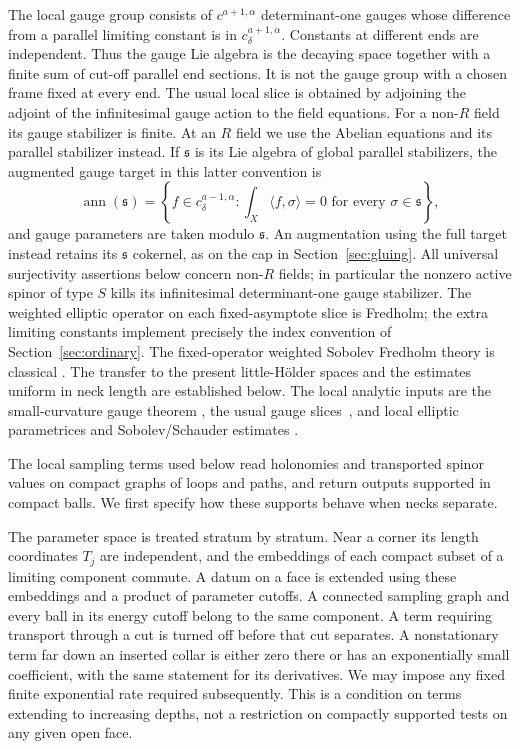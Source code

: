 The local gauge group consists of $c^{a+1,\alpha}$ determinant-one gauges
whose difference from a parallel limiting constant is in
$c^{a+1,\alpha}_\delta$.  Constants at different ends are independent.
Thus the gauge Lie algebra is the decaying space together with a finite
sum of cut-off parallel end sections.  It is not the gauge group with a
chosen frame fixed at every end.  The usual local slice is obtained by
adjoining the adjoint of the infinitesimal gauge action to the field
equations.  For a non-$R$ field its gauge stabilizer is finite.  At an $R$
field we use the Abelian equations and its parallel stabilizer instead.
If $\mathfrak s$ is its Lie algebra of global parallel stabilizers,
the augmented gauge target in this latter convention is
\[
 \operatorname{ann}(\mathfrak s)
 =\left\{f\in c^{a-1,\alpha}_\delta:
       \int_X\langle f,\sigma\rangle=0\text{ for every }
       \sigma\in\mathfrak s\right\},
\]
and gauge parameters are taken modulo $\mathfrak s$.  An augmentation
using the full target instead retains its $\mathfrak s$ cokernel,
as on the cap in Section~\ref{sec:gluing}.  All universal
surjectivity assertions below concern non-$R$ fields; in particular
the nonzero active spinor of type $S$ kills its infinitesimal
determinant-one gauge stabilizer.
The weighted elliptic operator on each fixed-asymptote slice is Fredholm;
the extra limiting constants implement precisely the index convention
of Section~\ref{sec:ordinary}.  The fixed-operator weighted Sobolev
Fredholm theory is classical
\cite[Theorems~6.2 and~8.1, Lemmas~7.1 and~7.3]{LockhartMcOwen1985}.
The transfer to the present little-H\"older spaces and the estimates
uniform in neck length are established below.  The local analytic
inputs are the small-curvature gauge theorem
\cite[Theorems~1.3 and~2.1, Corollary~2.2]{Uhlenbeck1982Connections},
the usual gauge slices~\cite{DonaldsonKronheimer1990}, and local
elliptic parametrices and Sobolev/Schauder estimates
\cite[Corollary~2.1.B and Theorem~2.2.C, revised author text]{Taylor1991}.

The local sampling terms used below read holonomies and transported
spinor values on compact graphs of loops and paths, and return outputs
supported in compact balls.  We first specify how these supports behave
when necks separate.

The parameter space is treated stratum by stratum.  Near a corner its
length coordinates $T_j$ are independent, and the embeddings of each
compact subset of a limiting component commute.  A datum on a face is
extended using these embeddings and a product of parameter cutoffs.
A connected sampling graph and every ball in its energy cutoff belong
to the same component.  A term requiring transport through a cut is
turned off before that cut separates.  A nonstationary term far down an
inserted collar is either zero there or has an exponentially small
coefficient, with the same statement for its derivatives.  We may impose
any fixed finite exponential rate required subsequently.  This is a
condition on terms extending to increasing depths, not a restriction on
compactly supported tests on any given open face.

